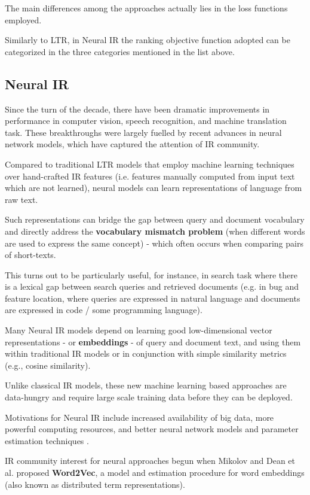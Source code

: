 The main differences among the approaches actually lies in the loss functions
employed.

Similarly to LTR, in Neural IR the ranking objective function adopted can be
categorized in the three categories mentioned in the list above.

\subsection{Neural IR}

Since the turn of the decade, there have been dramatic improvements in performance in computer vision, speech recognition, and machine translation task. These breakthroughs were largely fuelled by recent advances in neural network models, which have captured the attention of IR community.

Compared to traditional LTR models that employ machine learning techniques over hand-crafted IR features (i.e. features manually computed from input text which are not learned), neural models can learn representations of language from raw text.

Such representations can bridge the gap between query and document vocabulary and directly address the \textbf{vocabulary mismatch problem} (when different words are used to express the same concept) - which often occurs when comparing pairs of short-texts.

This turns out to be particularly useful, for instance, in search task where there is a lexical gap between search queries and retrieved documents (e.g. in bug and feature location, where queries are expressed in natural language and documents are expressed in code / some programming language).

Many Neural IR models depend on learning good
low-dimensional vector representations - or \textbf{embeddings} - of query and document text, and using them within traditional IR models or in conjunction with simple similarity metrics (e.g., cosine similarity).

Unlike classical IR models, these new machine learning based approaches are data-hungry and require large scale training data before they can be deployed.

Motivations for Neural IR include increased availability of big data, more powerful computing resources, and better neural network models and parameter estimation techniques \cite{neurev}.

IR community interest for neural approaches begun when Mikolov and Dean et al. \cite{w2v} proposed \textbf{Word2Vec}, a model and estimation procedure for word embeddings (also known as distributed term representations).

